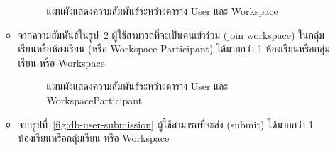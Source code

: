 \documentclass[12pt,oneside,openright,a4paper]{cpe-thai-project}
\begin{document}
\begin{enumerate}
\begin{itemize}
\begin{figure}[H]
                        \caption[แผนผังแสดงความสัมพันธ์ระหว่างตาราง User และ Workspace]{แผนผังแสดงความสัมพันธ์ระหว่างตาราง User และ Workspace}
                        \label{fig:db-user-workspace}
                    \end{figure}
                \item จากความสัมพันธ์ในรูป~\ref{fig:db-user-workspace_participant} ผู้ใช้สามารถที่จะเป็นคนเข้าร่วม (join workspace) ในกลุ่มเรียนหรือห้องเรียน (หรือ Workspace Participant) ได้มากกว่า 1 ห้องเรียนหรือกลุ่มเรียน หรือ Workspace
                    \begin{figure}[H]
                        \centering 
                        \caption[แผนผังแสดงความสัมพันธ์ระหว่างตาราง User และ WorkspaceParticipant]{แผนผังแสดงความสัมพันธ์ระหว่างตาราง User และ WorkspaceParticipant}
                        \label{fig:db-user-workspace_participant}
                    \end{figure}
                    \item จากรูปที่~\ref{fig:db-user-submission} ผู้ใช้สามารถที่จะส่ง (submit) ได้มากกว่า 1 ห้องเรียนหรือกลุ่มเรียน หรือ Workspace
                    \begin{figure}[H]

\end{figure}
\end{itemize}
\end{enumerate}
\end{document}
